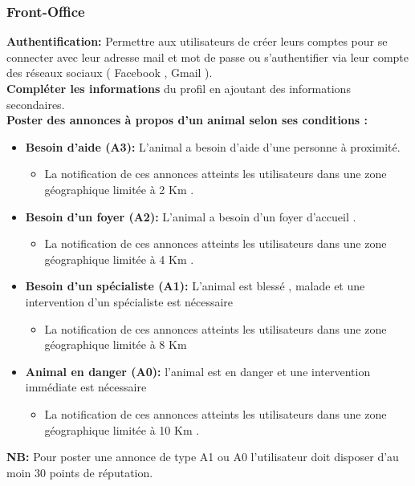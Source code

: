 \documentclass[11pt,a4paper,oneside]{book}
\begin{document}
	\subsubsection{Front-Office}
	\textbf{Authentification:}  Permettre aux utilisateurs de créer leurs comptes pour se connecter avec leur adresse mail et mot de passe ou s’authentifier via leur compte des réseaux sociaux ( Facebook , Gmail ).\\
	\textbf{Compléter les informations} du profil en ajoutant des informations secondaires.\\
	\textbf{Poster des annonces à propos d’un animal selon ses conditions :}
	\begin{itemize}
		\item \textbf{Besoin d’aide (A3):} L’animal a besoin d’aide d’une personne à proximité.
		\begin{itemize}
			\item La notification de ces annonces atteints les utilisateurs dans une zone géographique limitée à 2 Km .
		\end{itemize}
		\item \textbf{Besoin d’un foyer (A2):} L’animal a besoin d’un foyer d'accueil .
		\begin{itemize}
			\item La notification de ces annonces atteints les utilisateurs dans une zone géographique limitée à 4 Km .
		\end{itemize}
		\item \textbf{Besoin d’un spécialiste (A1):} L’animal est blessé , malade et une 
		intervention d’un spécialiste est nécessaire
		\begin{itemize}
			\item La notification de ces annonces atteints les utilisateurs dans une zone géographique limitée à 8 Km 
		\end{itemize}
		\item \textbf{Animal en danger (A0):} l’animal est en danger et une intervention 
		immédiate est nécessaire 
		\begin{itemize}
			\item La notification de ces annonces atteints les utilisateurs dans une zone géographique limitée à 10 Km .
		\end{itemize}
	\end{itemize}
	
	\textbf{NB:} Pour poster une annonce de type A1 ou A0 l’utilisateur doit disposer d’au moin 30 points de réputation.\\
	
\end{document}
